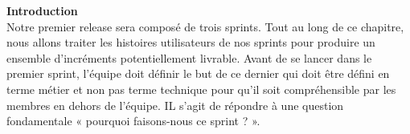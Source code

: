 
\textbf{Introduction}\\

Notre premier release sera composé de trois sprints. Tout au long de ce chapitre, nous allons traiter
les histoires utilisateurs de nos sprints pour produire un ensemble d’incréments potentiellement
livrable. Avant de se lancer dans le premier sprint, l’équipe doit définir le but de ce dernier qui doit
être défini en terme métier et non pas terme technique pour qu’il soit compréhensible par les membres
en dehors de l’équipe. IL s’agit de répondre à une question fondamentale « pourquoi faisons-nous
ce sprint ? ».